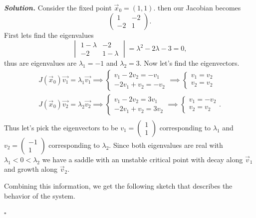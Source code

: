 \documentclass[12pt]{report}
\newenvironment{solution}[1][\it{Solution}]{\textbf{#1. } }{$\square$}
\begin{document}
\begin{solution}
    \noindent
    Consider the fixed point $\vec{x}_0 = (1,1)$. then our Jacobian becomes
    \[ 
        \begin{pmatrix}
            1 & -2\\
            -2 & 1
        \end{pmatrix}.
    \]
    First lets find the eigenvalues
    \[ 
        \begin{vmatrix}
            1 - \lambda & -2\\
            -2 & 1 - \lambda
        \end{vmatrix} = \lambda^2 - 2 \lambda - 3 = 0,
    \]
    thus are eigenvalues are $\lambda_1 = -1$ and $\lambda_2 = 3$. Now let's find the eigenvectors.
    \begin{align*}
        J(\vec{x}_0)\vec{v_1} = \lambda_1 \vec{v_1} \implies \begin{cases}
            v_1 - 2v_2 = -v_1\\
            -2v_1 + v_2 = -v_2
        \end{cases} \implies
        \begin{cases}
            v_1 = v_2\\
            v_2 = v_2
        \end{cases}\\
        J(\vec{x}_0)\vec{v_2} = \lambda_2 \vec{v_2} \implies \begin{cases}
            v_1 - 2v_2 = 3v_1\\
            -2v_1 + v_2 = 3v_2
        \end{cases} \implies
        \begin{cases}
            v_1 = -v_2\\
            v_2 = v_2
        \end{cases}.\\
    \end{align*}
    Thus let's pick the eigenvectors to be $v_1 = \begin{pmatrix}
        1\\1
    \end{pmatrix}$ corresponding to $\lambda_1$ and $v_2 = \begin{pmatrix}
        -1\\1
    \end{pmatrix}$ corresponding to $\lambda_2$. Since both eigenvalues are real with $\lambda_1 < 0 < \lambda_2$ we have a saddle with an unstable critical point with decay along $\vec{v}_1$ and growth along $\vec{v}_2$. 

    \noindent
    Combining this information, we get the following sketch that describes the behavior of the system. 
    

\end{solution}
\end{document}
